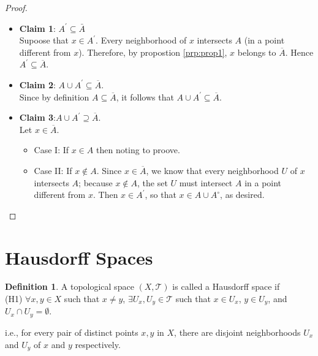 \documentclass[
]{book}
\providecommand{\tightlist}{%
  \setlength{\itemsep}{0pt}\setlength{\parskip}{0pt}}
\theoremstyle{definition}
\newtheorem{definition}{Definition}[chapter]
\theoremstyle{definition}
\theoremstyle{definition}
\theoremstyle{definition}
\theoremstyle{remark}
\begin{document}
\begin{proof}
\leavevmode

\begin{itemize}
\item
  \textbf{Claim 1}: \(A^{\prime}\subseteq \bar{A}\)\\
  Supoose that \(x\in A^{\prime}\). Every neighborhood of \(x\) intersects \(A\) (in a point different from \(x\)). Therefore, by propostion \ref{prp:prop1}, \(x\) belongs to \(\overline{A}\). Hence \(A^{\prime} \subseteq \overline{A}\).
\item
  \textbf{Claim 2}: \(A \cup A^{\prime} \subseteq \overline{A}\).\\
  Since by definition \(A \subseteq \overline{A}\), it follows that \(A \cup A^{\prime} \subseteq \overline{A}\).
\item
  \textbf{Claim 3}:\(A \cup A^{\prime}\supseteq \overline{A}\).\\
  Let \(x\in \overline{A}\).

  \begin{itemize}
  \tightlist
  \item
    Case I: If \(x\in A\) then noting to proove.
  \item
    Case II: If \(x\not\in A\). Since \(x \in \overline{A}\), we know that every neighborhood \(U\) of \(x\) intersects \(A\); because \(x \notin A\), the set \(U\) must intersect \(A\) in a point different from \(x\). Then \(x \in A^{\prime}\), so that \(x \in A \cup A^{\circ}\), as desired.
  \end{itemize}
\end{itemize}

\end{proof}

\hypertarget{hausdorff-spaces}{%
\section{Hausdorff Spaces}\label{hausdorff-spaces}}

\begin{definition}
\protect\hypertarget{def:unnamed-chunk-71}{}\label{def:unnamed-chunk-71}A topological space \((X,\mathcal{T})\) is called a Hausdorff space if\\
(H1) \(\forall x,y \in X\) such that \(x \neq y\), \(\exists U_x, U_y \in \mathcal{T}\) such that \(x \in U_x\), \(y \in U_y\), and \(U_x \cap U_y = \emptyset\).

i.e., for every pair of distinct points \(x, y\) in \(X\), there are disjoint neighborhoods \(U_x\) and \(U_y\) of \(x\) and \(y\) respectively.
\end{definition}
\end{document}
